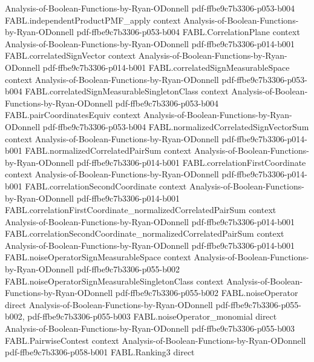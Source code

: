 \begin{theorem}
  {Analysis-of-Boolean-Functions-by-Ryan-ODonnell}
  {pdf-ffbe9c7b3306-p053-b004}
\proofstep
  {FABL.independentProductPMF_apply}
  {context}
  {Analysis-of-Boolean-Functions-by-Ryan-ODonnell}
  {pdf-ffbe9c7b3306-p053-b004}
\proofstep
  {FABL.CorrelationPlane}
  {context}
  {Analysis-of-Boolean-Functions-by-Ryan-ODonnell}
  {pdf-ffbe9c7b3306-p014-b001}
\proofstep
  {FABL.correlatedSignVector}
  {context}
  {Analysis-of-Boolean-Functions-by-Ryan-ODonnell}
  {pdf-ffbe9c7b3306-p014-b001}
\proofstep
  {FABL.correlatedSignMeasurableSpace}
  {context}
  {Analysis-of-Boolean-Functions-by-Ryan-ODonnell}
  {pdf-ffbe9c7b3306-p053-b004}
\proofstep
  {FABL.correlatedSignMeasurableSingletonClass}
  {context}
  {Analysis-of-Boolean-Functions-by-Ryan-ODonnell}
  {pdf-ffbe9c7b3306-p053-b004}
\proofstep
  {FABL.pairCoordinatesEquiv}
  {context}
  {Analysis-of-Boolean-Functions-by-Ryan-ODonnell}
  {pdf-ffbe9c7b3306-p053-b004}
\proofstep
  {FABL.normalizedCorrelatedSignVectorSum}
  {context}
  {Analysis-of-Boolean-Functions-by-Ryan-ODonnell}
  {pdf-ffbe9c7b3306-p014-b001}
\proofstep
  {FABL.normalizedCorrelatedPairSum}
  {context}
  {Analysis-of-Boolean-Functions-by-Ryan-ODonnell}
  {pdf-ffbe9c7b3306-p014-b001}
\proofstep
  {FABL.correlationFirstCoordinate}
  {context}
  {Analysis-of-Boolean-Functions-by-Ryan-ODonnell}
  {pdf-ffbe9c7b3306-p014-b001}
\proofstep
  {FABL.correlationSecondCoordinate}
  {context}
  {Analysis-of-Boolean-Functions-by-Ryan-ODonnell}
  {pdf-ffbe9c7b3306-p014-b001}
\proofstep
  {FABL.correlationFirstCoordinate_normalizedCorrelatedPairSum}
  {context}
  {Analysis-of-Boolean-Functions-by-Ryan-ODonnell}
  {pdf-ffbe9c7b3306-p014-b001}
\proofstep
  {FABL.correlationSecondCoordinate_normalizedCorrelatedPairSum}
  {context}
  {Analysis-of-Boolean-Functions-by-Ryan-ODonnell}
  {pdf-ffbe9c7b3306-p014-b001}
\proofstep
  {FABL.noiseOperatorSignMeasurableSpace}
  {context}
  {Analysis-of-Boolean-Functions-by-Ryan-ODonnell}
  {pdf-ffbe9c7b3306-p055-b002}
\proofstep
  {FABL.noiseOperatorSignMeasurableSingletonClass}
  {context}
  {Analysis-of-Boolean-Functions-by-Ryan-ODonnell}
  {pdf-ffbe9c7b3306-p055-b002}
\proofstep
  {FABL.noiseOperator}
  {direct}
  {Analysis-of-Boolean-Functions-by-Ryan-ODonnell}
  {pdf-ffbe9c7b3306-p055-b002,
    pdf-ffbe9c7b3306-p055-b003}
\proofstep
  {FABL.noiseOperator_monomial}
  {direct}
  {Analysis-of-Boolean-Functions-by-Ryan-ODonnell}
  {pdf-ffbe9c7b3306-p055-b003}
\proofstep
  {FABL.PairwiseContest}
  {context}
  {Analysis-of-Boolean-Functions-by-Ryan-ODonnell}
  {pdf-ffbe9c7b3306-p058-b001}
\proofstep
  {FABL.Ranking3}
  {direct}

\end{theorem}
